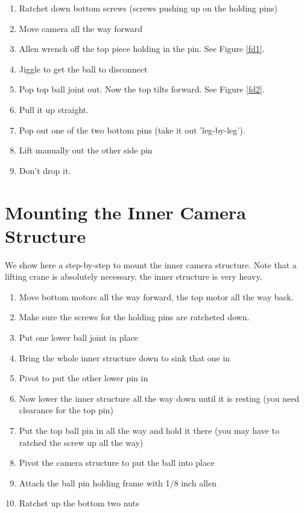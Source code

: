 \documentclass[11pt]{article}
\begin{document}
\begin{enumerate}
\item Ratchet down bottom screws (screws pushing up on the holding pins)
\item Move camera all the way forward
\item Allen wrench off the top piece holding in the pin.  See Figure \ref{fd1}.
\item Jiggle to get the ball to disconnect
\item Pop top ball joint out.  Now the top tilts forward.  See Figure \ref{fd2}.
\item Pull it up straight.
\item Pop out one of the two bottom pins (take it out 'leg-by-leg'). 
\item Lift manually out the other side pin
\item Don't drop it.  
\end{enumerate}

\section{Mounting the Inner Camera Structure}
We show here a step-by-step to mount the inner camera structure.  
Note that a lifting crane is absolutely necessary, the inner structure is very heavy.

\begin{enumerate}
\item Move bottom motors all the way forward, the top motor all the way back.
\item Make sure the screws for the holding pins are ratcheted down.
\item Put one lower ball joint in place
\item Bring the whole inner structure down to sink that one in
\item Pivot to put the other lower pin in
\item Now lower the inner structure all the way down until it is resting (you need clearance for the top pin)
\item Put the top ball pin in all the way and hold it there (you may have to ratched the screw up all the way)
\item Pivot the camera structure to put the ball into place 
\item Attach the ball pin holding frame with 1/8 inch allen
\item Ratchet up the bottom two nuts
\end{enumerate}
\end{document}
